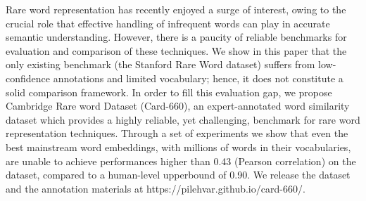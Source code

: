 Rare word representation has recently enjoyed a surge of interest, owing to the crucial role that effective handling of infrequent words can play in accurate semantic understanding. However, there is a paucity of reliable benchmarks for evaluation and comparison of these techniques. We show in this paper that the only existing benchmark (the Stanford Rare Word dataset) suffers from low-confidence annotations and limited vocabulary; hence, it does not constitute a solid comparison framework. In order to fill this evaluation gap, we propose Cambridge Rare word Dataset (Card-660), an expert-annotated word similarity dataset which provides a highly reliable, yet challenging, benchmark for rare word representation techniques. Through a set of experiments we show that even the best mainstream word embeddings, with millions of words in their vocabularies, are unable to achieve performances higher than 0.43 (Pearson correlation) on the dataset, compared to a human-level upperbound of 0.90. We release the dataset and the annotation materials at https://pilehvar.github.io/card-660/.
